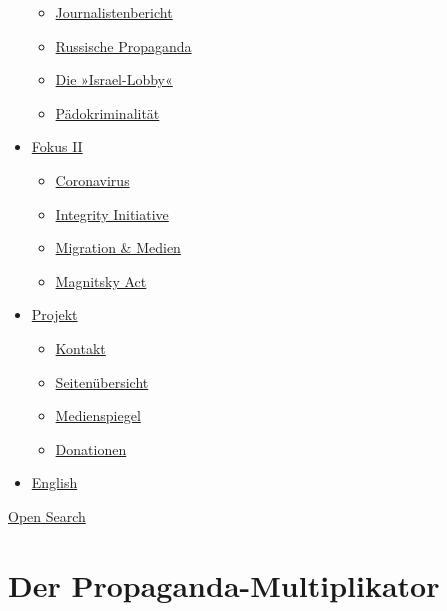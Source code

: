 \begin{itemize}
  \begin{itemize}
  \tightlist
  \item
    \href{https://swprs.org/bericht-eines-journalisten/}{Journalistenbericht}
  \item
    \href{https://swprs.org/russische-propaganda/}{Russische Propaganda}
  \item
    \href{https://swprs.org/die-israel-lobby-fakten-und-mythen/}{Die
    »Israel-Lobby«}
  \item
    \href{https://swprs.org/geopolitik-und-paedokriminalitaet/}{Pädokriminalität}
  \end{itemize}
\item
  \href{https://swprs.org/migration-und-medien/}{Fokus II}

  \begin{itemize}
  \tightlist
  \item
    \href{https://swprs.org/covid-19-hinweis-ii/}{Coronavirus}
  \item
    \href{https://swprs.org/die-integrity-initiative/}{Integrity
    Initiative}
  \item
    \href{https://swprs.org/migration-und-medien/}{Migration \& Medien}
  \item
    \href{https://swprs.org/der-fall-magnitsky/}{Magnitsky Act}
  \end{itemize}
\item
  \href{https://swprs.org/kontakt/}{Projekt}

  \begin{itemize}
  \tightlist
  \item
    \href{https://swprs.org/kontakt/}{Kontakt}
  \item
    \href{https://swprs.org/uebersicht/}{Seitenübersicht}
  \item
    \href{https://swprs.org/medienspiegel/}{Medienspiegel}
  \item
    \href{https://swprs.org/donationen/}{Donationen}
  \end{itemize}
\item
  \href{https://swprs.org/contact/}{English}
\end{itemize}

\protect\hyperlink{}{Open Search}

\hypertarget{der-propaganda-multiplikator}{%
\section{Der
Propaganda-Multiplikator}\label{der-propaganda-multiplikator}}

